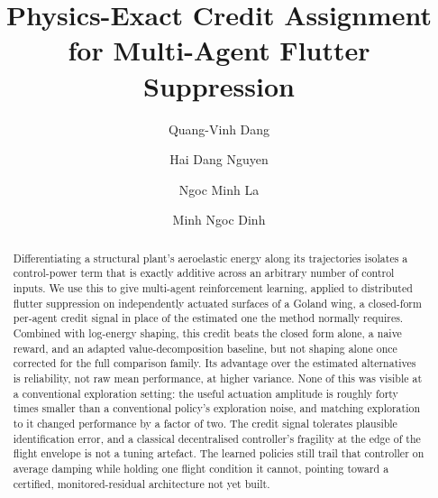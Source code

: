 \documentclass[preprint,11pt]{elsarticle}
\begin{document}
\begin{frontmatter}

\title{Physics-Exact Credit Assignment for Multi-Agent Flutter Suppression}

\author[buv]{Quang-Vinh Dang}
\author[xtech]{Hai Dang Nguyen}
\author[vgu]{Ngoc Minh La}
\author[mu]{Minh Ngoc Dinh}


\begin{abstract}
Differentiating a structural plant's aeroelastic energy along its
trajectories isolates a control-power term that is exactly additive across an
arbitrary number of control inputs. We use this to give multi-agent
reinforcement learning, applied to distributed flutter suppression on
independently actuated surfaces of a Goland wing, a closed-form per-agent
credit signal in place of the estimated one the method normally requires.
Combined with log-energy shaping, this credit beats the closed form alone, a
naive reward, and an adapted value-decomposition baseline, but not shaping
alone once corrected for the full comparison family. Its advantage over the
estimated alternatives is reliability, not raw mean performance, at higher
variance. None of this was visible at a conventional exploration setting:
the useful actuation amplitude is roughly forty times smaller than a
conventional policy's exploration noise, and matching exploration to it
changed performance by a factor of two. The credit signal tolerates
plausible identification error, and a classical decentralised controller's
fragility at the edge of the flight envelope is not a tuning artefact. The
learned policies still trail that controller on average damping while
holding one flight condition it cannot, pointing toward a certified,
monitored-residual architecture not yet built.
\end{abstract}


\end{frontmatter}
\end{document}
